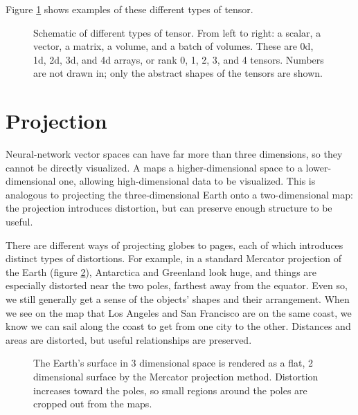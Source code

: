 Figure \ref{abridged_tensor_types} shows examples of these different types of tensor. 

\begin{figure}[htbp]
\centering
{}
\caption[Soraya Boza.]{Schematic of different types of tensor. From left to right: a scalar, a vector, a matrix, a volume, and a batch of volumes. These are 0d, 1d, 2d, 3d, and 4d arrays, or rank 0, 1, 2, 3, and 4 tensors. Numbers are not drawn in; only the abstract shapes of the tensors are shown.}
\label{abridged_tensor_types}
\end{figure}

\section{Projection}


Neural-network vector spaces can have far more than three dimensions, so they cannot be directly visualized. A  maps a higher-dimensional space to a lower-dimensional one, allowing high-dimensional data to be visualized. This is analogous to projecting the three-dimensional Earth onto a two-dimensional map: the projection introduces distortion, but can preserve enough structure to be useful.

There are different ways of projecting globes to pages, each of which introduces distinct types of distortions. For example, in a standard Mercator projection of the Earth (figure \ref{abridged_mercator}), Antarctica and Greenland look huge, and things are especially distorted near the two poles, farthest away from the equator. Even so, we still generally get a sense of the objects' shapes and their arrangement. When we see on the map that Los Angeles and San Francisco are on the same coast, we know we can sail along the coast to get from one city to the other. Distances and areas are distorted, but useful relationships are preserved.

\begin{figure}[htbp]
\centering
{}
\caption[Scott Hotton's modification of an image from the Cartographic Research Lab at the University of Alabama.]{The Earth's surface in 3 dimensional space is rendered as a flat, 2 dimensional surface by the Mercator projection method. Distortion increases toward the poles, so small regions around the poles are cropped out from the maps.}
\label{abridged_mercator}
\end{figure}

